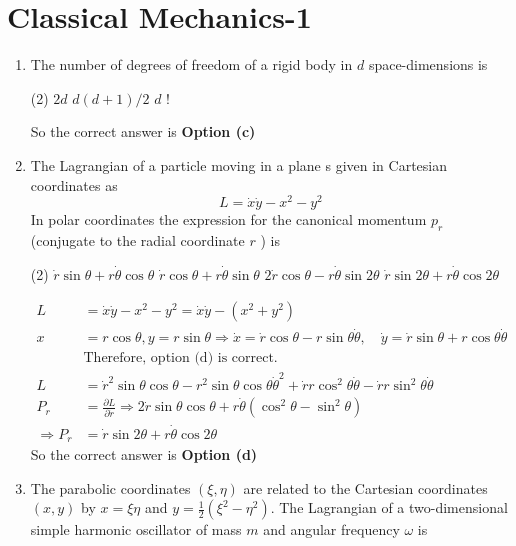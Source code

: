\chapter{Classical Mechanics-1}
\begin{enumerate}
	\item The number of degrees of freedom of a rigid body in $d$ space-dimensions is

	 \begin{tasks}(2)
		\task[\textbf{a.}]$2 d$
		\task[\textbf{c.}]$d(d+1) / 2$
		\task[\textbf{d.}]  $d$ !
	\end{tasks}
	\begin{answer}
	So the correct answer is \textbf{Option (c)}
	\end{answer}
	\item The Lagrangian of a particle moving in a plane s given in Cartesian coordinates as
	$$
	L=\dot{x} \dot{y}-x^{2}-y^{2}
	$$
	In polar coordinates the expression for the canonical momentum $p_{r}$ (conjugate to the radial coordinate $r$ ) is

	 \begin{tasks}(2)
		\task[\textbf{a.}]$\dot{r} \sin \theta+r \dot{\theta} \cos \theta$
		\task[\textbf{b.}]$\dot{r} \cos \theta+r \dot{\theta} \sin \theta$
		\task[\textbf{c.}]$2 \dot{r} \cos \theta-r \dot{\theta} \sin 2 \theta$
		\task[\textbf{d.}] $\dot{r} \sin 2 \theta+r \dot{\theta} \cos 2 \theta$
	\end{tasks}
\begin{answer}
	$$
	\begin{aligned}
	L&=\dot{x} \dot{y}-x^{2}-y^{2}=\dot{x} \dot{y}-\left(x^{2}+y^{2}\right)\\
	x&=r \cos \theta, y=r \sin \theta \Rightarrow \dot{x}=\dot{r} \cos \theta-r \sin \theta \dot{\theta}, \quad \dot{y}=\dot{r} \sin \theta+r \cos \theta \dot{\theta}\\
	&\text{Therefore, option
	(d) is correct.}\\
L&=\dot{r}^{2} \sin \theta \cos \theta-r^{2} \sin \theta \cos \theta \dot{\theta}^{2}+\dot{r} r \cos ^{2} \theta \dot{\theta}-\dot{r} r \sin ^{2} \theta \dot{\theta}\\
P_{r}&=\frac{\partial L}{\partial \dot{r}} \Rightarrow 2 \dot{r} \sin \theta \cos \theta+r \dot{\theta}\left(\cos ^{2} \theta-\sin ^{2} \theta\right)\\
\Rightarrow P_{r}&=\dot{r} \sin 2 \theta+r \dot{\theta} \cos 2 \theta
\end{aligned}
$$
	So the correct answer is \textbf{Option (d)}
\end{answer}
	\item The parabolic coordinates $(\xi, \eta)$ are related to the Cartesian coordinates $(x, y)$ by $x=\xi \eta$ and $y=\frac{1}{2}\left(\xi^{2}-\eta^{2}\right)$. The Lagrangian of a two-dimensional simple harmonic oscillator of mass $m$ and angular frequency $\omega$ is


\end{enumerate}
